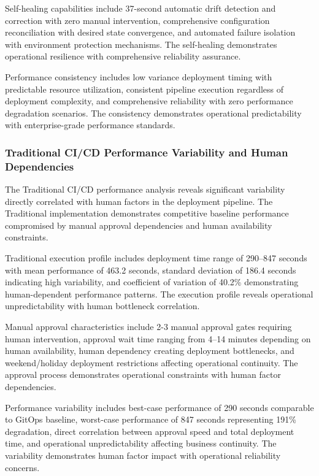 Self-healing capabilities include 37-second automatic drift detection and correction with zero manual intervention, comprehensive configuration reconciliation with desired state convergence, and automated failure isolation with environment protection mechanisms. The self-healing demonstrates operational resilience with comprehensive reliability assurance.

Performance consistency includes low variance deployment timing with predictable resource utilization, consistent pipeline execution regardless of deployment complexity, and comprehensive reliability with zero performance degradation scenarios. The consistency demonstrates operational predictability with enterprise-grade performance standards.

\subsubsection{Traditional CI/CD Performance Variability and Human Dependencies}

The Traditional CI/CD performance analysis reveals significant variability directly correlated with human factors in the deployment pipeline. The Traditional implementation demonstrates competitive baseline performance compromised by manual approval dependencies and human availability constraints.

Traditional execution profile includes deployment time range of 290--847 seconds with mean performance of 463.2 seconds, standard deviation of 186.4 seconds indicating high variability, and coefficient of variation of 40.2\% demonstrating human-dependent performance patterns. The execution profile reveals operational unpredictability with human bottleneck correlation.

Manual approval characteristics include 2-3 manual approval gates requiring human intervention, approval wait time ranging from 4--14 minutes depending on human availability, human dependency creating deployment bottlenecks, and weekend/holiday deployment restrictions affecting operational continuity. The approval process demonstrates operational constraints with human factor dependencies.

Performance variability includes best-case performance of 290 seconds comparable to GitOps baseline, worst-case performance of 847 seconds representing 191\% degradation, direct correlation between approval speed and total deployment time, and operational unpredictability affecting business continuity. The variability demonstrates human factor impact with operational reliability concerns.

